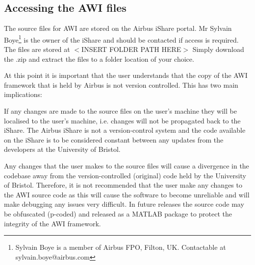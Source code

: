 \subsection*{Accessing the AWI files}

The source files for AWI are stored on the Airbus iShare portal. Mr Sylvain Boye\footnote{Sylvain Boye is a member of Airbus FPO, Filton, UK. Contactable at sylvain.boye@airbus.com} is the owner of the iShare and should be contacted if access is required. The files are stored at $<$INSERT FOLDER PATH HERE$>$ Simply download the .zip and extract the files to a folder location of your choice. 

At this point it is important that the user understands that the copy of the AWI framework that is held by Airbus is not version controlled. This has two main implications:
\begin{enumerate}
{\indentitem\item If any changes are made to the source files on the user’s machine they will be localised to the user’s machine, i.e. changes will not be propagated back to the iShare. The Airbus iShare is not a version-control system and the code available on the iShare is to be considered constant between any updates from the developers at the University of Bristol.}
{\indentitem\item Any changes that the user makes to the source files will cause a divergence in the codebase away from the version-controlled (original) code held by the University of Bristol. Therefore, it is not recommended that the user make any changes to the AWI source code as this will cause the software to become unreliable and will make debugging any issues very difficult. In future releases the source code may be obfuscated (p-coded) and released as a MATLAB package to protect the integrity of the AWI framework.}
\end{enumerate}


